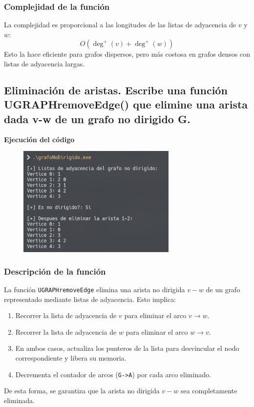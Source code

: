 \documentclass{article}
\begin{document}
        \subsubsection*{Complejidad de la función}
            La complejidad es proporcional a las longitudes de las listas de adyacencia de \( v \) y \( w \):
            \[
            O(\deg^+(v) + \deg^+(w))
            \]
            Esto la hace eficiente para grafos dispersos, pero más costosa en grafos densos con listas de adyacencia largas.


    \subsection{Eliminación de aristas. Escribe una función UGRAPHremoveEdge() que elimine una arista dada v-w de un grafo no dirigido G.}

        

        \textbf{Ejecución del código}
            \begin{figure}[H]
            	\centering
             	\includegraphics[width=0.7\textwidth,keepaspectratio]{img/exercise8.png}
            \end{figure}

        \subsubsection*{Descripción de la función}
            La función \texttt{UGRAPHremoveEdge} elimina una arista no dirigida \( v-w \) de un grafo representado mediante listas de adyacencia. Esto implica:
            \begin{enumerate}
                \item Recorrer la lista de adyacencia de \( v \) para eliminar el arco \( v \to w \).
                \item Recorrer la lista de adyacencia de \( w \) para eliminar el arco \( w \to v \).
                \item En ambos casos, actualiza los punteros de la lista para desvincular el nodo correspondiente y libera su memoria.
                \item Decrementa el contador de arcos (\texttt{G->A}) por cada arco eliminado.
            \end{enumerate}
            De esta forma, se garantiza que la arista no dirigida \( v-w \) sea completamente eliminada.
            
\end{document}
